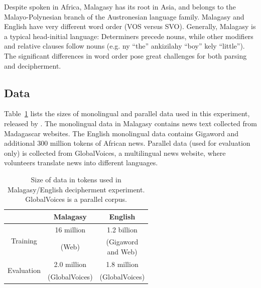 
Despite spoken in Africa, Malagasy has its root in Asia, and belongs to the Malayo-Polynesian branch of the Austronesian language family. Malagasy and English have very different word order (VOS versus SVO). Generally, Malagasy is a typical head-initial language: Determiners precede nouns, while other modifiers and relative clauses follow nouns (e.g. ny ``the'' ankizilahy ``boy'' kely ``little''). The significant differences in word order pose great challenges for both parsing and decipherment.


\subsection{Data}

Table~\ref{mlg-en-data} lists the sizes of monolingual and parallel data used in this experiment, released by . The monolingual data in Malagasy contains news text collected from Madagascar websites. The English monolingual data contains Gigaword and additional 300 million tokens of African news. Parallel data (used for evaluation only) is collected from GlobalVoices, a multilingual news website, where volunteers translate news into different languages.

 \begin{table}
 \begin{center}
 \begin{tabular}{ |c|c|c| } \hline
             & Malagasy & English \\ \hline
\multirow{2}{*}{Training} & 16 million & 1.2 billion\\ 
& (Web) & \pbox{2cm}{ (Gigaword \\ and Web)}  \\ \hline
\multirow{2}{*}{Evaluation} & 2.0 million& 1.8 million \\
 & (GlobalVoices) & (GlobalVoices)  \\ \hline
 \end{tabular}
 \caption{Size of data in tokens used in Malagasy/English decipherment experiment. GlobalVoices is a parallel corpus.}
 \label{mlg-en-data}
 \end{center}
 \end{table}
 
